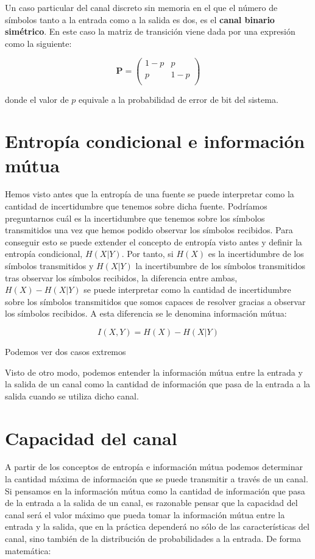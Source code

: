 \documentclass[es,apuntes]{uah}
\begin{document}
Un caso particular del canal discreto sin memoria en el que el número de símbolos tanto a la entrada como a la salida es dos, es el {\bf canal binario simétrico}. En este caso la matriz de transición viene dada por una expresión como la siguiente:

\begin{displaymath}
	\mathbf{P} = \left ( \begin{array}{cc} 1-p & p \\ p & 1-p \\ \end{array} \right )
\end{displaymath}

donde el valor de $p$ equivale a la probabilidad de error de bit del sistema. 


\section{Entropía condicional e información mútua}

Hemos visto antes que la entropía de una fuente se puede interpretar como la cantidad de incertidumbre que tenemos sobre dicha fuente. Podríamos preguntarnos cuál es la incertidumbre que tenemos sobre los símbolos transmitidos una vez que hemos podido observar los símbolos recibidos. Para conseguir esto se puede extender el concepto de entropía visto antes y definir la entropía condicional, $H(X|Y)$. Por tanto, si $H(X)$ es la incertidumbre de los símbolos transmitidos y $H(X|Y)$ la incertibumbre de los símbolos transmitidos tras observar los símbolos recibidos, la diferencia entre ambas, $H(X) - H(X|Y)$ se puede interpretar como la cantidad de incertidumbre sobre los símbolos transmitidos que somos capaces de resolver gracias a observar los símbolos recibidos. A esta diferencia se le denomina información mútua:

\begin{displaymath}
    I(X,Y)= H(X) - H(X|Y)
\end{displaymath}

Podemos ver dos casos extremos

Visto de otro modo, podemos entender la información mútua entre la entrada y la salida de un canal como la cantidad de información que pasa de la entrada a la salida cuando se utiliza dicho canal. 



\section{Capacidad del canal}
A partir de los conceptos de entropía e información mútua podemos determinar la cantidad máxima de información que se puede transmitir a través de un canal. Si pensamos en la información mútua como la cantidad de información que pasa de la entrada a la salida de un canal, es razonable pensar que la capacidad del canal será el valor máximo que pueda tomar la información mútua entre la entrada y la salida, que en la práctica dependerá no sólo de las características del canal, sino también de la distribución de probabilidades a la entrada. De forma matemática:
\end{document}
